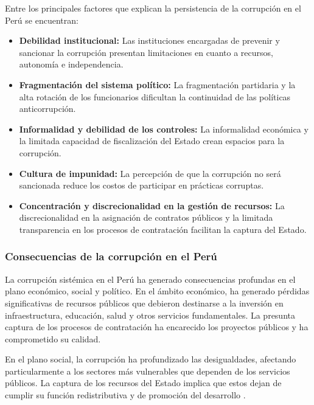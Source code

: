 \documentclass[12pt,a4paper]{article}
\begin{document}
Entre los principales factores que explican la persistencia de la corrupción en el Perú se encuentran:

\begin{itemize}
    \item \textbf{Debilidad institucional:} Las instituciones encargadas de prevenir y sancionar la corrupción presentan limitaciones en cuanto a recursos, autonomía e independencia.
    
    \item \textbf{Fragmentación del sistema político:} La fragmentación partidaria y la alta rotación de los funcionarios dificultan la continuidad de las políticas anticorrupción.
    
    \item \textbf{Informalidad y debilidad de los controles:} La informalidad económica y la limitada capacidad de fiscalización del Estado crean espacios para la corrupción.
    
    \item \textbf{Cultura de impunidad:} La percepción de que la corrupción no será sancionada reduce los costos de participar en prácticas corruptas.
    
    \item \textbf{Concentración y discrecionalidad en la gestión de recursos:} La discrecionalidad en la asignación de contratos públicos y la limitada transparencia en los procesos de contratación facilitan la captura del Estado.
\end{itemize}

\subsubsection{Consecuencias de la corrupción en el Perú}

La corrupción sistémica en el Perú ha generado consecuencias profundas en el plano económico, social y político. En el ámbito económico, ha generado pérdidas significativas de recursos públicos que debieron destinarse a la inversión en infraestructura, educación, salud y otros servicios fundamentales. La presunta captura de los procesos de contratación ha encarecido los proyectos públicos y ha comprometido su calidad.

En el plano social, la corrupción ha profundizado las desigualdades, afectando particularmente a los sectores más vulnerables que dependen de los servicios públicos. La captura de los recursos del Estado implica que estos dejan de cumplir su función redistributiva y de promoción del desarrollo \parencite{transparencia2023}.
\end{document}
